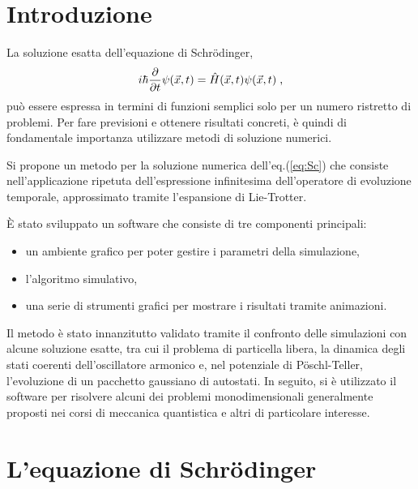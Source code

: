 \documentclass[12pt]{report}
\begin{document}

\thispagestyle{empty}
\clearpage
\setcounter{page}{1}

\chapter*{Introduzione}
\label{ch:introduzione}

La soluzione esatta dell'equazione di Schr\"odinger, 
\begin{equation}
    \centering
    i \hbar \frac{\partial}{\partial t} \psi (\vec{x}, t) = \hat{H} (\vec{x}, t) \psi (\vec{x}, t) \; \text{,}
    \label{eq:Sc}
\end{equation}
può essere espressa in termini di funzioni semplici solo per un numero ristretto di problemi. Per fare previsioni e ottenere risultati concreti, è quindi di fondamentale importanza utilizzare metodi di soluzione numerici.

Si propone un metodo per la soluzione numerica dell'eq.(\ref{eq:Sc}) che consiste nell'applicazione ripetuta dell'espressione infinitesima dell'operatore di evoluzione temporale, approssimato tramite l'espansione di  Lie-Trotter.

È stato sviluppato un software che consiste di tre componenti principali: 
\begin{itemize} [nolistsep, leftmargin=1.5cm]
    \item un ambiente grafico per poter gestire i parametri della simulazione,
    \item l'algoritmo simulativo,
    \item una serie di strumenti grafici per mostrare i risultati tramite animazioni.
\end{itemize}

Il metodo è stato innanzitutto validato tramite il confronto delle simulazioni con alcune soluzione esatte, tra cui il problema di particella libera, la dinamica degli stati coerenti dell'oscillatore armonico e, nel potenziale di P\"oschl-Teller, l'evoluzione di un pacchetto gaussiano di autostati. In seguito, si è utilizzato il software per risolvere alcuni dei problemi monodimensionali generalmente proposti nei corsi di meccanica quantistica e altri di particolare interesse.

\chapter{L'equazione di Schr\"odinger}
\label{ch:eqS}
\end{document}

